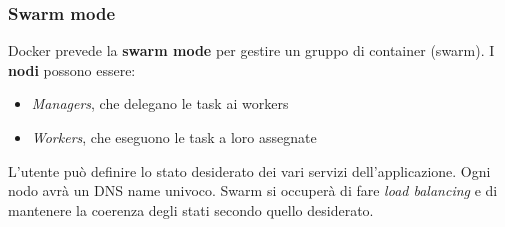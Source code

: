 \subsubsection{Swarm mode}
Docker prevede la \textbf{swarm mode} per gestire un gruppo di container (swarm). I \textbf{nodi} possono essere:
\begin{itemize}
	\item \emph{Managers}, che delegano le task ai workers
	\item \emph{Workers}, che eseguono le task a loro assegnate
\end{itemize}
L'utente può definire lo stato desiderato dei vari servizi dell'applicazione. Ogni nodo avrà un DNS name univoco. Swarm si occuperà di fare \emph{load balancing} e di mantenere la coerenza degli stati secondo quello desiderato.